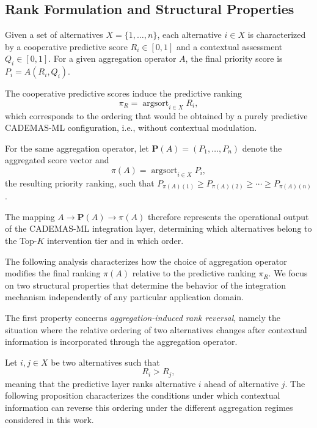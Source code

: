 \documentclass[mathematics,article,submit,moreauthors]{Definitions/mdpi}
\begin{document}
{\color{blue}

\subsection{Rank Formulation and Structural Properties}
\label{subsect:rank_properties}

Given a set of alternatives $X=\{1,\ldots,n\}$, each alternative $i\in X$ is characterized by a cooperative predictive score $R_i\in[0,1]$ and a contextual assessment $Q_i\in[0,1]$. For a given aggregation operator $A$, the final priority score is $P_i=A(R_i,Q_i)$.

The cooperative predictive scores induce the predictive ranking
\begin{equation}
\pi_R=\operatorname{argsort}_{i\in X}R_i,
\end{equation}
which corresponds to the ordering that would be obtained by a purely predictive CADEMAS-ML configuration, i.e., without contextual modulation.

For the same aggregation operator, let $\mathbf{P}(A)=(P_1,\ldots,P_n)$ denote the aggregated score vector and
\begin{equation}
\pi(A)=\operatorname{argsort}_{i\in X}P_i,
\end{equation}
the resulting priority ranking, such that $P_{\pi(A)(1)}\ge P_{\pi(A)(2)}\ge\cdots\ge P_{\pi(A)(n)}$.

The mapping $A \longrightarrow \mathbf{P}(A) \longrightarrow \pi(A)$
therefore represents the operational output of the CADEMAS-ML integration layer, determining which alternatives belong to the Top-$K$ intervention tier and in which order.

The following analysis characterizes how the choice of aggregation operator modifies the final ranking $\pi(A)$ relative to the predictive ranking $\pi_R$. We focus on two structural properties that determine the behavior of the integration mechanism independently of any particular application domain.

The first property concerns \emph{aggregation-induced rank reversal}, namely the situation where the relative ordering of two alternatives changes after contextual information is incorporated through the aggregation operator.

Let $i,j\in X$ be two alternatives such that
\[
R_i>R_j,
\]
meaning that the predictive layer ranks alternative $i$ ahead of alternative $j$. The following proposition characterizes the conditions under which contextual information can reverse this ordering under the different aggregation regimes considered in this work.

}
\end{document}
